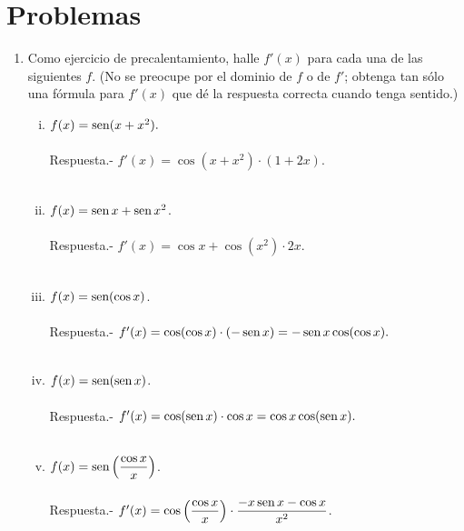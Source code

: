 \section{Problemas}
\begin{enumerate}[\bfseries 1.]

    \item Como ejercicio de precalentamiento, halle $f'(x)$ para cada una de las siguientes $f$. (No se preocupe por el dominio de $f$ o de $f'$; obtenga tan sólo una fórmula para $f'(x)$ que dé la respuesta correcta cuando tenga sentido.)\\

	\begin{enumerate}[(i)]

	    \item $f(x)=\mathop{\mbox{\normalfont sen}}\nolimits(x+x^2).$\\\\ 
		Respuesta.-\; $f'(x)=\cos(x+x^2)\cdot (1+2x).$\\\\

	    \item $f(x)=\mathop{\mbox{\normalfont sen}}\nolimits x + \mathop{\mbox{\normalfont sen}}\nolimits x^2$.\\\\
		Respuesta.-\; $f'(x)=\cos x + \cos(x^2)\cdot 2x.$\\\\

	    \item $f(x)=\mathop{\mbox{\normalfont sen}}\nolimits(\cos x)$.\\\\
		Respuesta.-\; $f'(x)=\cos(\cos x)\cdot (-\mathop{\mbox{\normalfont sen}}\nolimits x)=-\mathop{\mbox{\normalfont sen}}\nolimits x \cos(\cos x).$\\\\

	    \item $f(x)=\mathop{\mbox{\normalfont sen}}\nolimits(\mathop{\mbox{\normalfont sen}}\nolimits x)$.\\\\
		Respuesta.-\; $f'(x)=\cos(\mathop{\mbox{\normalfont sen}}\nolimits x)\cdot \cos x = \cos x \cos(\mathop{\mbox{\normalfont sen}}\nolimits x).$\\\\

	    \item $f(x)=\mathop{\mbox{\normalfont sen}}\nolimits\left(\dfrac{\cos x}{x}\right)$.\\\\
		Respuesta.-\; $f'(x)=\cos\left(\dfrac{\cos x}{x}\right)\cdot \dfrac{-x\mathop{\mbox{\normalfont sen}}\nolimits x - \cos x}{x^2}$.\\\\


\end{enumerate}
\end{enumerate}
